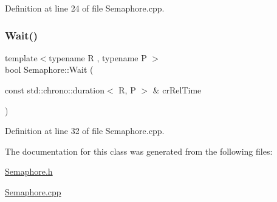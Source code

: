 Definition at line 24 of file Semaphore.\+cpp.

\mbox{\label{class_semaphore_a7f700173ae86ae623684109066e07656}} 
\subsubsection{\texorpdfstring{Wait()}{Wait()}\hspace{0.1cm}{\footnotesize\ttfamily [2/2]}}
{\footnotesize\ttfamily template$<$typename R , typename P $>$ \\
bool Semaphore\+::\+Wait (\begin{DoxyParamCaption}\item[{const std\+::chrono\+::duration$<$ R, P $>$ \&}]{cr\+Rel\+Time }\end{DoxyParamCaption})}



Definition at line 32 of file Semaphore.\+cpp.



The documentation for this class was generated from the following files\+:\begin{DoxyCompactItemize}
\item 
\hyperlink{_semaphore_8h}{Semaphore.\+h}\item 
\hyperlink{_semaphore_8cpp}{Semaphore.\+cpp}\end{DoxyCompactItemize}
